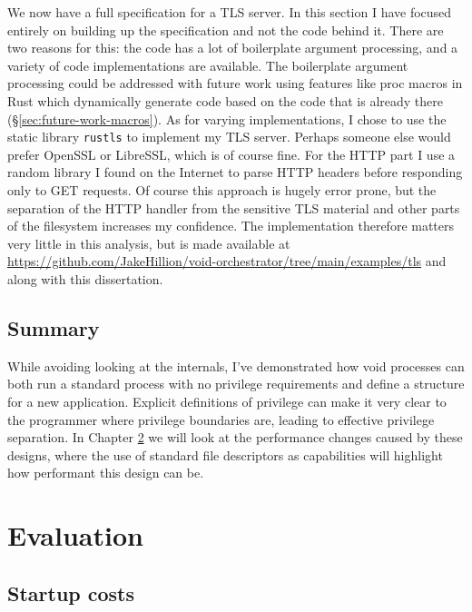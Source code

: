 \documentclass[12pt,a4paper,twoside]{report}
\begin{document}
We now have a full specification for a TLS server. In this section I have focused entirely on building up the specification and not the code behind it. There are two reasons for this: the code has a lot of boilerplate argument processing, and a variety of code implementations are available. The boilerplate argument processing could be addressed with future work using features like proc macros in Rust which dynamically generate code based on the code that is already there (§\ref{sec:future-work-macros}). As for varying implementations, I chose to use the static library \texttt{rustls} to implement my TLS server. Perhaps someone else would prefer OpenSSL or LibreSSL, which is of course fine. For the HTTP part I use a random library I found on the Internet to parse HTTP headers before responding only to GET requests. Of course this approach is hugely error prone, but the separation of the HTTP handler from the sensitive TLS material and other parts of the filesystem increases my confidence. The implementation therefore matters very little in this analysis, but is made available at \url{https://github.com/JakeHillion/void-orchestrator/tree/main/examples/tls} and along with this dissertation.

\section{Summary}

While avoiding looking at the internals, I've demonstrated how void processes can both run a standard process with no privilege requirements and define a structure for a new application. Explicit definitions of privilege can make it very clear to the programmer where privilege boundaries are, leading to effective privilege separation. In Chapter \ref{chap:evaluation} we will look at the performance changes caused by these designs, where the use of standard file descriptors as capabilities will highlight how performant this design can be.


\chapter{Evaluation}
\label{chap:evaluation}


\section{Startup costs}
\label{sec:evaluation-startup}
\end{document}

